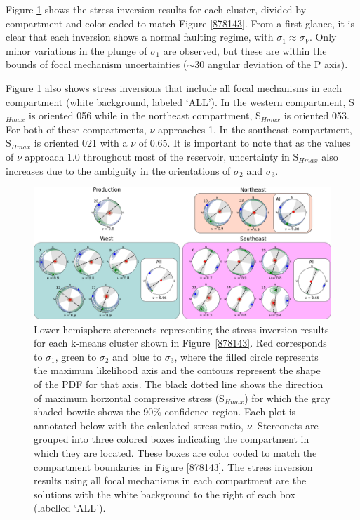 Figure \ref{434168} shows the stress inversion results for each cluster, divided by compartment and color coded to match Figure \ref{878143}. From a first glance, it is clear that each inversion shows a normal faulting regime, with $\sigma_{1}\approx{\sigma_{V}}$. Only minor variations in the plunge of $\sigma_{1}$ are observed, but these are within the bounds of focal mechanism uncertainties ($\sim$30\textdegree{} angular deviation of the P axis).

Figure \ref{434168} also shows stress inversions that include all focal mechanisms in each compartment (white background, labeled `ALL'). In the western compartment, S$_{Hmax}$ is oriented 056\textdegree{} while in the northeast compartment, S$_{Hmax}$ is oriented 053\textdegree{}. For both of these compartments, $\nu$ approaches 1. In the southeast compartment, S$_{Hmax}$ is oriented 021\textdegree{} with a $\nu$ of 0.65. It is important to note that as the values of $\nu$ approach 1.0 throughout most of the reservoir, uncertainty in S$_{Hmax}$ also increases due to the ambiguity in the orientations of $\sigma_{2}$ and $\sigma_{3}$.

\begin{figure}
\begin{center}
\includegraphics[width=\textwidth,height=\textheight,keepaspectratio]{Chapter_5_FMs/figures/Rot_kmeans_inversion_30/Rot_temps_GC_dets_kmeans_30_compartments_combined_lores}
\caption[Rotokawa stress inversions from kmeans clusters]{{
Lower hemisphere stereonets representing the stress inversion results for each k-means cluster shown in Figure~{\ref{878143}}. Red corresponds to $\sigma_{1}$, green to $\sigma_{2}$ and blue to $\sigma_{3}$, where the filled circle represents the maximum likelihood axis and the contours represent the shape of the PDF for that axis. The black dotted line shows the direction of maximum horzontal compressive stress (S$_{Hmax}$) for which the gray shaded bowtie shows the 90\% confidence region. Each plot is annotated below with the calculated stress ratio, $\nu$. Stereonets are grouped into three colored boxes indicating the compartment in which they are located. These boxes are color coded to match the compartment boundaries in Figure \ref{878143}. The stress inversion results using all focal mechanisms in each compartment are the solutions with the white background to the right of each box (labelled `ALL').
{\label{434168}}%
}}
\end{center}
\end{figure}

